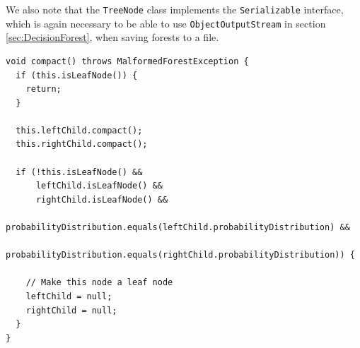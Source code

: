 \documentclass[12pt,twoside,notitlepage]{report}
\begin{document}
                We also note that the \texttt{TreeNode} class implements the \texttt{Serializable} interface, 
                which is again necessary to be able to use \texttt{ObjectOutputStream} in section 
                \ref{sec:DecisionForest}, when saving forests to a file.

                \begin{lstlisting}[float=tp,caption={[The \texttt{TreeNode} declaration.] The \texttt{TreeNode} declaration, found as a static class within the 
                \texttt{DecisionForest} class.},label={lst:TreeNode}]
void compact() throws MalformedForestException {
  if (this.isLeafNode()) {
    return;
  }
  
  this.leftChild.compact();
  this.rightChild.compact();

  if (!this.isLeafNode() && 
      leftChild.isLeafNode() &&
      rightChild.isLeafNode() &&
      probabilityDistribution.equals(leftChild.probabilityDistribution) &&
      probabilityDistribution.equals(rightChild.probabilityDistribution)) {
    
    // Make this node a leaf node
    leftChild = null;
    rightChild = null;
  }
}
                \end{lstlisting}
\end{document}
